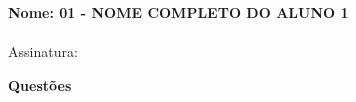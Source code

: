 \documentclass[addpoints,,12pt]{exam}
\begin{document}
	\begin{mdframed}[align=left]
		\textbf{Nome: 01 - NOME COMPLETO DO ALUNO 1}
		\\
		\\Assinatura:
	\end{mdframed}

	\newpage	
	
\noindent \textbf{Questões}

\begin{questions}










\end{questions}
\end{document}
